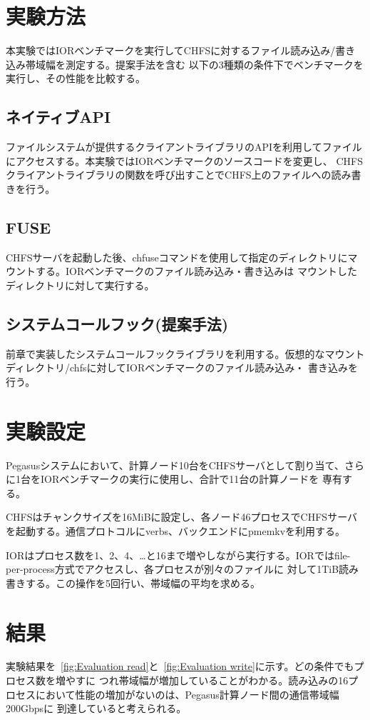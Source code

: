 \documentclass[a4paper,11pt]{jreport}
\begin{document}
\section{実験方法}
本実験ではIORベンチマークを実行してCHFSに対するファイル読み込み/書き込み帯域幅を測定する。提案手法を含む
以下の3種類の条件下でベンチマークを実行し、その性能を比較する。

\subsection{ネイティブAPI}
ファイルシステムが提供するクライアントライブラリのAPIを利用してファイルにアクセスする。本実験ではIORベンチマークのソースコードを変更し、
CHFSクライアントライブラリの関数を呼び出すことでCHFS上のファイルへの読み書きを行う。
\subsection{FUSE}
CHFSサーバを起動した後、chfuseコマンドを使用して指定のディレクトリにマウントする。IORベンチマークのファイル読み込み・書き込みは
マウントしたディレクトリに対して実行する。
\subsection{システムコールフック(提案手法)}
前章で実装したシステムコールフックライブラリを利用する。仮想的なマウントディレクトリ/chfsに対してIORベンチマークのファイル読み込み・
書き込みを行う。
\section{実験設定}
Pegasusシステムにおいて、計算ノード10台をCHFSサーバとして割り当て、さらに1台をIORベンチマークの実行に使用し、合計で11台の計算ノードを
専有する。

CHFSはチャンクサイズを16MiBに設定し、各ノード46プロセスでCHFSサーバを起動する。通信プロトコルにverbs、バックエンドにpmemkvを利用する。

IORはプロセス数を1、2、4、…と16まで増やしながら実行する。IORではfile-per-process方式でアクセスし、各プロセスが別々のファイルに
対して1TiB読み書きする。この操作を5回行い、帯域幅の平均を求める。
\section{結果}

実験結果を\figurename~\ref{fig:Evaluation read}と\figurename~\ref{fig:Evaluation write}に示す。どの条件でもプロセス数を増やすに
つれ帯域幅が増加していることがわかる。読み込みの16プロセスにおいて性能の増加がないのは、Pegasus計算ノード間の通信帯域幅200Gbpsに
到達していると考えられる。
\end{document}

